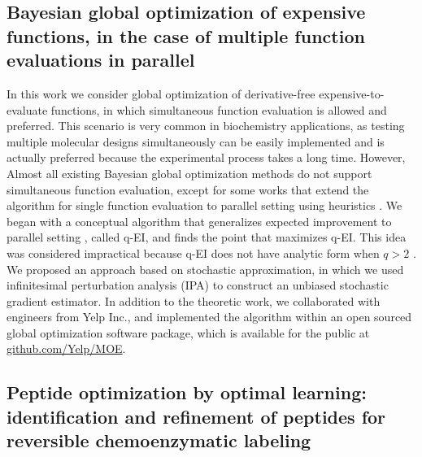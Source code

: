 \documentclass[11pt]{article}
\begin{document}
\subsection{Bayesian global optimization of expensive functions, in the case of 
multiple function evaluations in parallel}

In this work we consider global optimization of derivative-free expensive-to-evaluate 
functions, in which simultaneous function evaluation is allowed and
preferred. This scenario is very common in biochemistry applications, as testing
multiple molecular designs simultaneously can be easily implemented and is actually
preferred because the experimental process takes a long time. However, Almost all 
existing Bayesian global optimization methods do not support simultaneous function 
evaluation, except for some works that extend the algorithm for single function evaluation
to parallel setting using heuristics \citep{ginsbourgertwo, chevalier2013fast, 
ginsbourger2010kriging, janusevskis2012expected}. We began with a conceptual algorithm that
generalizes expected improvement to parallel setting \citep{ginsbourger2007multi}, 
called q-EI, and finds the point that maximizes q-EI. This idea was considered
impractical because q-EI does not have analytic form when $q > 2$ \citep{ginsbourger2007multi}. 
We proposed an approach based on stochastic approximation, in which we used infinitesimal 
perturbation analysis (IPA) to construct an unbiased stochastic gradient estimator.
In addition to the theoretic work, we collaborated with engineers from Yelp Inc.,
and implemented the algorithm within an open sourced global optimization software
package, which is available for the public at \underline{github.com/Yelp/MOE}.

\subsection{Peptide optimization by optimal learning: identification and refinement
of peptides for reversible chemoenzymatic labeling}
\end{document}
